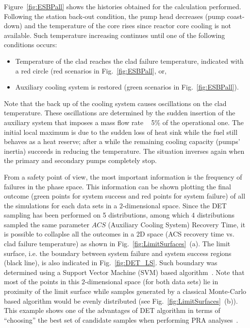Figure~\ref{fig:ESBPall} shows the histories obtained for the calculation performed.
Following the station back-out condition, the pump head decreases (pump coast-down) and the temperature of the core rises since reactor core cooling is not available. Such temperature increasing continues until one of the following conditions occurs:
\vspace{-5mm}
\begin{itemize}
\item Temperature of the clad reaches the clad failure temperature, indicated with a red circle (red scenarios in Fig.~\ref{fig:ESBPall}, or,
\item Auxiliary cooling system is restored (green scenarios in Fig.~\ref{fig:ESBPall}).
\end{itemize}
\vspace{-5mm}

Note that the back up of the cooling system causes oscillations on the clad temperature. These oscillations are determined by the sudden insertion of the auxiliary system that imposes a mass flow rate ~ 5\% of the operational one. The initial local maximum is due to the sudden loss of heat sink while the fuel still behaves as a heat reserve; after a while the remaining cooling capacity (pumps’ inertia) succeeds in reducing the temperature. The situation inverses again when the primary and secondary pumps completely stop. 

From a safety point of view, the most important information is the frequency of failures in the phase space. This information can be shown plotting the final outcome (green points for system success and red points for system failure) of all the simulations for each data sets in a $2$-dimensional space. Since the DET sampling has been performed on 5 distributions, among which 4 distributions sampled the same parameter $ACS$ (Auxiliary Cooling System) Recovery Time, it is possible to collaplse all the outcomes in a 2D space (ACS recovery time vs. clad failure temperature) as shown in Fig.~\ref{fig:LimitSurfaces}~(a).
The limit surface, i.e. the boundary between system failure and system success regions (black line), is also indicated in Fig.~\ref{fig:DET_LS}. Such boundary was determined using a Support Vector Machine (SVM) based algorithm~\cite{mandelliANS_RISMC}.
Note that most of the points in this $2$-dimensional space (for both data sets) lie in proximity  of the limit surface while samples generated by a classical Monte-Carlo based algorithm would be evenly distributed (see Fig.~\ref{fig:LimitSurfaces}~(b)). 
This example shows one of the advantages of DET algorithm in terms of ``choosing'' the best set of candidate samples when performing PRA analyses~\cite{alfonsiPSA}.

